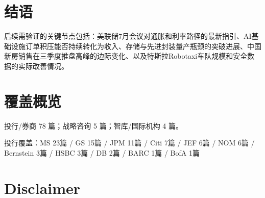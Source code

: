 \documentclass[11pt]{ctexart}
\begin{document}
\section{结语}
后续需验证的关键节点包括：美联储7月会议对通胀和利率路径的最新指引、AI基础设施订单积压能否持续转化为收入、存储与先进封装量产瓶颈的突破进展、中国新房销售在三季度推盘高峰的边际变化、以及特斯拉Robotaxi车队规模和安全数据的实际改善情况。
\newpage
\section{覆盖概览}
投行/券商 78 篇；战略咨询 5 篇；智库/国际机构 4 篇。\par
投行覆盖：MS 23篇 / GS 15篇 / JPM 11篇 / Citi 7篇 / JEF 6篇 / NOM 6篇 / Bernstein 3篇 / HSBC 3篇 / DB 2篇 / BARC 1篇 / BofA 1篇\par
\section{Disclaimer}
\end{document}
